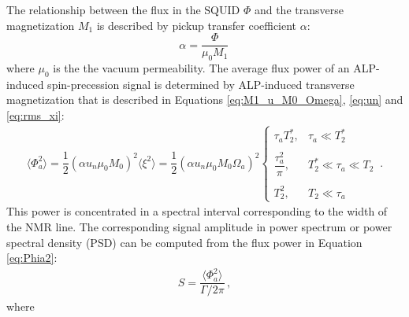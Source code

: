 \documentclass{WileyMSP-template}
\newcommand{\AW}[1]{\textcolor{cyan}{Arne: #1}}
\begin{document}
	The relationship between the flux in the SQUID $\Phi$ and the transverse magnetization $M_1$ is described by pickup transfer coefficient $\alpha$:
	\begin{equation}
		\alpha = \dfrac{\Phi}{\mu_0 M_1}
		\,\label{eq:alpha}
	\end{equation}
	where $\mu_0$ is the the vacuum permeability. 
	The average flux power of an ALP-induced spin-precession signal is determined by ALP-induced transverse magnetization that is described in Equations \eqref{eq:M1_u_M0_Omega}, \eqref{eq:un} and \eqref{eq:rms_xi}:
	\begin{align}
		\langle \Phi_a^2 \rangle = \dfrac{1}{2}(\alpha u_n \mu_0 M_0 )^2 \langle \xi^2 \rangle
		=\dfrac{1}{2}(\alpha u_n \mu_0 M_0 \Omega_a)^2 \left\{
		\begin{array}{cl}
			\tau_a T_2^* ,
			&  \tau_a \ll T_2^*\\
			& \\
			\dfrac{\tau_a^2}{\pi} ,
			&  T_2^*\ll\tau_a \ll T_2\\
			& \\
			T_2^2 ,
			&  T_2 \ll \tau_a
		\end{array} \right.
		\,. \label{eq:Phia2}
	\end{align}
	This power is concentrated in a spectral interval corresponding to the width of the NMR line.
	The corresponding signal amplitude in power spectrum or power spectral density (PSD) can be computed from the flux power in Equation\,\eqref{eq:Phia2}:
	\begin{align}
		S = \dfrac{\langle \Phi_a^2 \rangle}{\Gamma /2\pi} 
		\,, \label{eq:S_expectation}
	\end{align}
	where 
\end{document}
